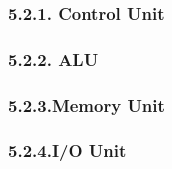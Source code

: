 \documentclass[
]{article}
\begin{document}
\hypertarget{control-unit-1}{%
\subsubsection{5.2.1. Control Unit}\label{control-unit-1}}

\hypertarget{alu-1}{%
\subsubsection{5.2.2. ALU}\label{alu-1}}

\hypertarget{memory-unit-1}{%
\subsubsection{5.2.3.Memory Unit}\label{memory-unit-1}}

\hypertarget{io-unit-1}{%
\subsubsection{5.2.4.I/O Unit}\label{io-unit-1}}
\end{document}

